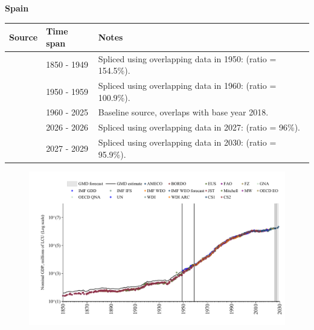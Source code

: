 \documentclass[12pt,a4paper,landscape]{article}
\begin{document}
\begin{adjustbox}{max totalsize={\paperwidth}{\paperheight},center}
\begin{minipage}[t][\textheight][t]{\textwidth}
\vspace*{0.5cm}
{}
\begin{center}
{\Large\bfseries Spain}
\end{center}
\vspace{0.5cm}
\begin{table}[H]
\centering
\small
\begin{tabular}{|l|l|l|}
\hline
\textbf{Source} & \textbf{Time span} & \textbf{Notes} \\
\hline
\rowcolor{white}\cite{CS2_ESP}& 1850 - 1949 &Spliced using overlapping data in 1950: (ratio = 154.5\%).\\
\rowcolor{lightgray}\cite{IMF_GDD}& 1950 - 1959 &Spliced using overlapping data in 1960: (ratio = 100.9\%).\\
\rowcolor{white}\cite{OECD_EO}& 1960 - 2025 &Baseline source, overlaps with base year 2018.\\
\rowcolor{lightgray}\cite{AMECO}& 2026 - 2026 &Spliced using overlapping data in 2027: (ratio = 96\%).\\
\rowcolor{white}\cite{IMF_WEO_forecast}& 2027 - 2029 &Spliced using overlapping data in 2030: (ratio = 95.9\%).\\
\hline
\end{tabular}
\end{table}
\begin{figure}[H]
\centering
\includegraphics[width=\textwidth,height=0.6\textheight,keepaspectratio]{graphs/ESP_nGDP.pdf}
\end{figure}
\end{minipage}
\end{adjustbox}
\end{document}
